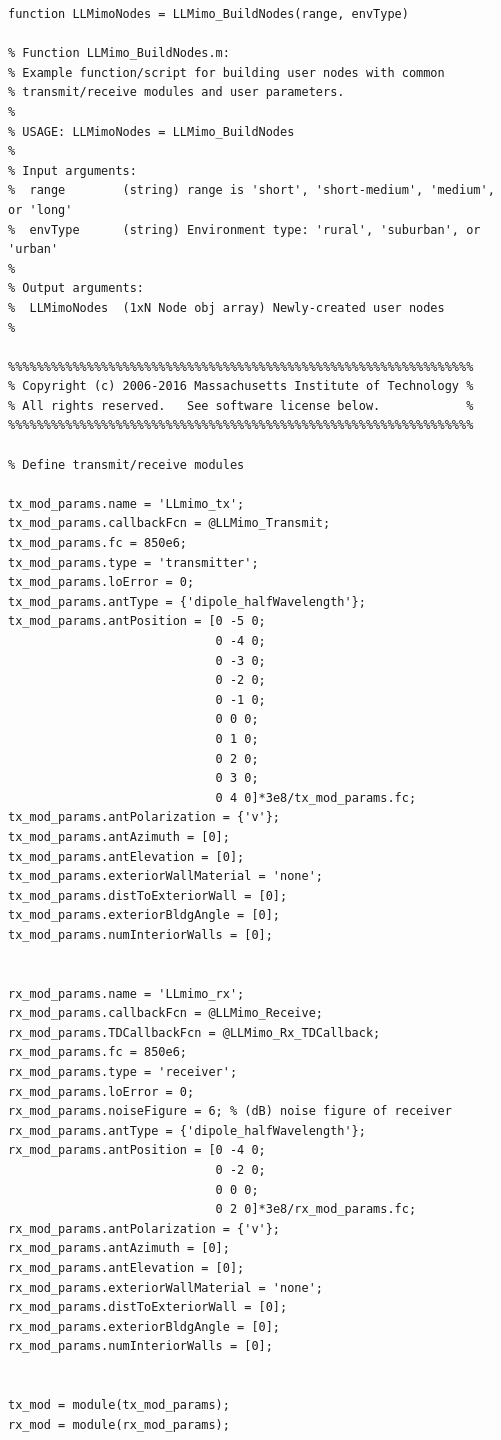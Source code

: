 \begin{lstlisting}[name=llmimoBuild]
function LLMimoNodes = LLMimo_BuildNodes(range, envType)

% Function LLMimo_BuildNodes.m:
% Example function/script for building user nodes with common
% transmit/receive modules and user parameters.
% 
% USAGE: LLMimoNodes = LLMimo_BuildNodes
%
% Input arguments:
%  range        (string) range is 'short', 'short-medium', 'medium', or 'long'
%  envType      (string) Environment type: 'rural', 'suburban', or 'urban'
%
% Output arguments:
%  LLMimoNodes  (1xN Node obj array) Newly-created user nodes
%

%%%%%%%%%%%%%%%%%%%%%%%%%%%%%%%%%%%%%%%%%%%%%%%%%%%%%%%%%%%%%%%%%
% Copyright (c) 2006-2016 Massachusetts Institute of Technology %
% All rights reserved.   See software license below.            %
%%%%%%%%%%%%%%%%%%%%%%%%%%%%%%%%%%%%%%%%%%%%%%%%%%%%%%%%%%%%%%%%%

% Define transmit/receive modules

tx_mod_params.name = 'LLmimo_tx';
tx_mod_params.callbackFcn = @LLMimo_Transmit;
tx_mod_params.fc = 850e6;
tx_mod_params.type = 'transmitter';
tx_mod_params.loError = 0;
tx_mod_params.antType = {'dipole_halfWavelength'};
tx_mod_params.antPosition = [0 -5 0;
                             0 -4 0;
                             0 -3 0;
                             0 -2 0;
                             0 -1 0;
                             0 0 0;
                             0 1 0;
                             0 2 0;
                             0 3 0;
                             0 4 0]*3e8/tx_mod_params.fc;
tx_mod_params.antPolarization = {'v'};
tx_mod_params.antAzimuth = [0];
tx_mod_params.antElevation = [0];
tx_mod_params.exteriorWallMaterial = 'none';
tx_mod_params.distToExteriorWall = [0];
tx_mod_params.exteriorBldgAngle = [0];
tx_mod_params.numInteriorWalls = [0];


rx_mod_params.name = 'LLmimo_rx';
rx_mod_params.callbackFcn = @LLMimo_Receive;
rx_mod_params.TDCallbackFcn = @LLMimo_Rx_TDCallback;
rx_mod_params.fc = 850e6;
rx_mod_params.type = 'receiver';
rx_mod_params.loError = 0;
rx_mod_params.noiseFigure = 6; % (dB) noise figure of receiver
rx_mod_params.antType = {'dipole_halfWavelength'};
rx_mod_params.antPosition = [0 -4 0;
                             0 -2 0;
                             0 0 0;
                             0 2 0]*3e8/rx_mod_params.fc;
rx_mod_params.antPolarization = {'v'};
rx_mod_params.antAzimuth = [0];
rx_mod_params.antElevation = [0];
rx_mod_params.exteriorWallMaterial = 'none';
rx_mod_params.distToExteriorWall = [0];
rx_mod_params.exteriorBldgAngle = [0];
rx_mod_params.numInteriorWalls = [0];


tx_mod = module(tx_mod_params);
rx_mod = module(rx_mod_params);

\end{lstlisting}

